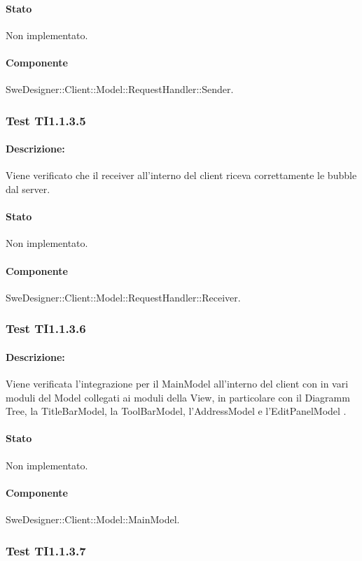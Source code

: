 \documentclass[../PianoDiQualifica.tex]{subfiles}
\begin{document}
	\paragraph{Stato} Non implementato.
	\paragraph{Componente} SweDesigner::Client::Model::RequestHandler::Sender.
	
	\subsubsection{Test TI1.1.3.5}
	\paragraph{Descrizione:} Viene verificato che il receiver all'interno del client riceva correttamente le bubble dal server.
	\paragraph{Stato} Non implementato.
	\paragraph{Componente} SweDesigner::Client::Model::RequestHandler::Receiver.
	\subsubsection{Test TI1.1.3.6}
	\paragraph{Descrizione:} Viene verificata l'integrazione per il MainModel all'interno del client con in vari moduli del Model collegati ai moduli della View, in particolare con il Diagramm Tree, la TitleBarModel, la ToolBarModel, l'AddressModel e l'EditPanelModel . 
	\paragraph{Stato} Non implementato.
	\paragraph{Componente} SweDesigner::Client::Model::MainModel.
	\subsubsection{Test TI1.1.3.7}
\end{document}
